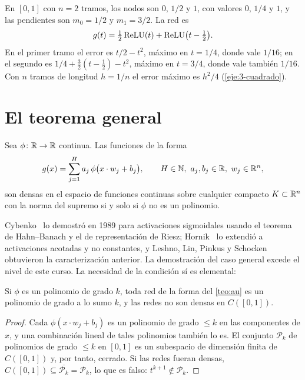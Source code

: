 \begin{ejemplo}[Aproximación de $t^{2}$]\label{ej:cuadrado}
En $[0,1]$ con $n=2$ tramos, los nodos son $0$, $1/2$ y $1$, con valores $0$, $1/4$ y $1$, y las pendientes son $m_0=1/2$ y $m_1=3/2$. La red es
\[
g(t)=\tfrac12\operatorname{ReLU}(t)+\operatorname{ReLU}\bigl(t-\tfrac12\bigr).
\]
En el primer tramo el error es $t/2-t^{2}$, máximo en $t=1/4$, donde vale $1/16$; en el segundo es $1/4+\tfrac32(t-\tfrac12)-t^{2}$, máximo en $t=3/4$, donde vale también $1/16$. Con $n$ tramos de longitud $h=1/n$ el error máximo es $h^{2}/4$ (\cref{eje:3-cuadrado}).
\end{ejemplo}

\section{El teorema general}

\begin{teorema}\label{teo:au}
Sea $\phi\colon\mathbb{R}\to\mathbb{R}$ continua. Las funciones de la forma
\[
g(x)=\sum_{j=1}^{H}a_j\,\phi\bigl(x\cdot w_j+b_j\bigr),\qquad H\in\mathbb{N},\ a_j,b_j\in\R,\ w_j\in\R^{n},
\]
son densas en el espacio de funciones continuas sobre cualquier compacto $K\subset\mathbb{R}^{n}$ con la norma del supremo si y solo si $\phi$ no es un polinomio.
\end{teorema}

Cybenko~\cite{cybenko} lo demostró en 1989 para activaciones sigmoidales usando el teorema de Hahn--Banach y el de representación de Riesz; Hornik~\cite{hornik} lo extendió a activaciones acotadas y no constantes, y Leshno, Lin, Pinkus y Schocken~\cite{leshno} obtuvieron la caracterización anterior. La demostración del caso general excede el nivel de este curso. La necesidad de la condición sí es elemental:

\begin{proposicion}\label{prop:polinomio}
Si $\phi$ es un polinomio de grado $k$, toda red de la forma del \cref{teo:au} es un polinomio de grado a lo sumo $k$, y las redes no son densas en $C([0,1])$.
\end{proposicion}

\begin{proof}
Cada $\phi(x\cdot w_j+b_j)$ es un polinomio de grado $\le k$ en las componentes de $x$, y una combinación lineal de tales polinomios también lo es. El conjunto $\mathcal{P}_k$ de polinomios de grado $\le k$ en $[0,1]$ es un subespacio de dimensión finita de $C([0,1])$ y, por tanto, cerrado. Si las redes fueran densas, $C([0,1])\subseteq\overline{\mathcal{P}_k}=\mathcal{P}_k$, lo que es falso: $t^{k+1}\notin\mathcal{P}_k$.
\end{proof}

